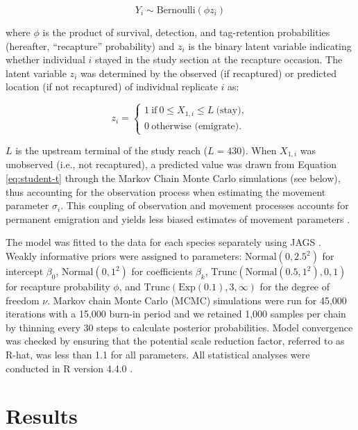 \documentclass[11pt, class=article, crop=false]{standalone}
\begin{document}
\begin{equation}
    Y_i \sim \text{Bernoulli}(\phi z_i)
\end{equation}

where $\phi$ is the product of survival, detection, and tag-retention probabilities (hereafter, ``recapture'' probability) and $z_i$ is the binary latent variable indicating whether individual $i$ stayed in the study section at the recapture occasion.
The latent variable $z_i$ was determined by the observed (if recaptured) or predicted location (if not recaptured) of individual replicate $i$ as: 

\begin{equation}
    z_i =
    \begin{cases}
        1~\text{if}~0 \le X_{1,i} \le L~\text{(stay)},\\
        0~\text{otherwise (emigrate)}.
    \end{cases}
\end{equation}

$L$ is the upstream terminal of the study reach ($L = 430$). When $X_{1,i}$ was unobserved (i.e., not recaptured), a predicted value was drawn from Equation \ref{eq:student-t} through the Markov Chain Monte Carlo simulations (see below), thus accounting for the observation process when estimating the movement parameter $\sigma_i$.
This coupling of observation and movement processes accounts for permanent emigration and yields less biased estimates of movement parameters \citep{teruiModelingDispersalUsing2020}.

The model was fitted to the data for each species separately using JAGS \citep{plummerJAGSProgramAnalysis2003}. Weakly informative priors were assigned to parameters: $\text{Normal}(0, 2.5^2)$ for intercept $\beta_0$, $\text{Normal}(0, 1^2)$ for coefficients $\beta_k$, $\text{Trunc}(\text{Normal}(0.5, 1^2), 0, 1)$ for recapture probability $\phi$, and $\text{Trunc}(\text{Exp}(0.1), 3, \infty)$ for the degree of freedom $\nu$. Markov chain Monte Carlo (MCMC) simulations were run for 45,000 iterations with a 15,000 burn-in period and we retained 1,000 samples per chain by thinning every 30 steps to calculate posterior probabilities. Model convergence was checked by ensuring that the potential scale reduction factor, referred to as R-hat, was less than 1.1 for all parameters. All statistical analyses were conducted in R version 4.4.0 \citep{rcoreteamLanguageEnvironmentStatistical2021}.

\section{Results}
\end{document}
